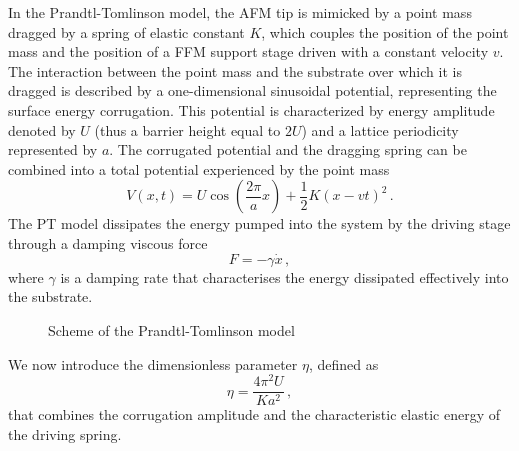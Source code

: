 In the Prandtl-Tomlinson model, the AFM tip is mimicked by a point mass dragged by a spring of elastic constant $K$, which couples the position of the point mass and the position of a FFM support stage driven with a constant velocity $v$. The interaction between the point mass and the substrate over which it is dragged is described by a one-dimensional sinusoidal potential, representing the surface energy corrugation.
This potential is characterized by energy amplitude denoted by $U$ (thus a barrier height equal to $2 U$) and a lattice periodicity represented by $a$.
The corrugated potential and the dragging spring can be combined into a total potential experienced by the point mass 
\begin{equation}
    V(x,t) = U \cos \left(\frac{2\pi}{a} x\right) + \frac{1}{2}K (x-vt)^2 \, .
\end{equation}
The PT model dissipates the energy pumped into the system by the driving stage through a damping viscous force 
\begin{equation}
    F = - \gamma \dot{x}\, ,
\end{equation} 
where $\gamma$ is a damping rate that characterises the energy dissipated effectively into the substrate.
\begin{figure}
    \centering
\caption{Scheme of the Prandtl-Tomlinson model}
\end{figure}

We now introduce the dimensionless parameter $\eta$, defined as
\begin{equation}
    \eta = \frac{4 \pi^2 U}{Ka^2}\, ,
    \label{eta}
\end{equation}
that combines the corrugation amplitude and the characteristic elastic energy of the driving spring.

